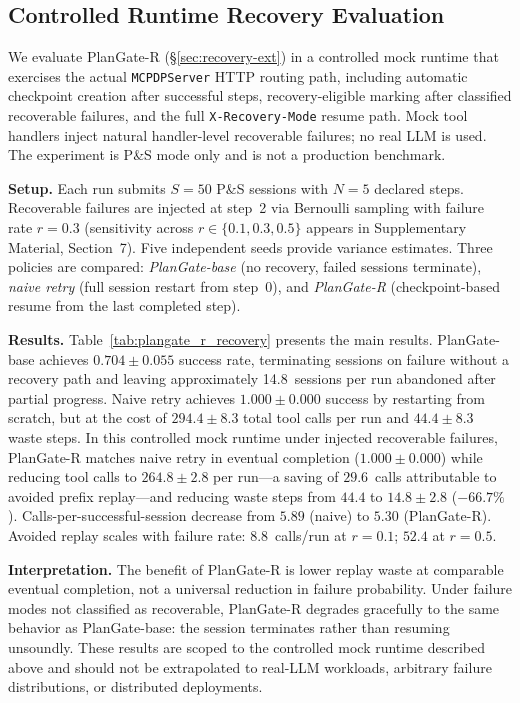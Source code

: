 \documentclass[sigconf,review,anonymous]{acmart}
\begin{document}
\subsection{Controlled Runtime Recovery Evaluation}
\label{sec:recovery-eval}

We evaluate PlanGate-R (\S\ref{sec:recovery-ext}) in a controlled mock runtime that exercises the actual \texttt{MCPDPServer} HTTP routing path, including automatic checkpoint creation after successful steps, recovery-eligible marking after classified recoverable failures, and the full \texttt{X-Recovery-Mode} resume path.
Mock tool handlers inject natural handler-level recoverable failures; no real LLM is used.
The experiment is P\&S mode only and is not a production benchmark.

\textbf{Setup.}
Each run submits $S{=}50$ P\&S sessions with $N{=}5$ declared steps.
Recoverable failures are injected at step~2 via Bernoulli sampling with failure rate $r{=}0.3$ (sensitivity across $r\in\{0.1,0.3,0.5\}$ appears in Supplementary Material, Section~7).
Five independent seeds provide variance estimates.
Three policies are compared:
\emph{PlanGate-base} (no recovery, failed sessions terminate),
\emph{naive retry} (full session restart from step~0), and
\emph{PlanGate-R} (checkpoint-based resume from the last completed step).

\textbf{Results.}
Table~\ref{tab:plangate_r_recovery} presents the main results.
PlanGate-base achieves $0.704\pm0.055$ success rate, terminating sessions on failure without a recovery path and leaving approximately 14.8~sessions per run abandoned after partial progress.
Naive retry achieves $1.000\pm0.000$ success by restarting from scratch, but at the cost of $294.4\pm8.3$ total tool calls per run and $44.4\pm8.3$ waste steps.
In this controlled mock runtime under injected recoverable failures, PlanGate-R matches naive retry in eventual completion ($1.000\pm0.000$) while reducing tool calls to $264.8\pm2.8$ per run---a saving of $29.6$~calls attributable to avoided prefix replay---and reducing waste steps from $44.4$ to $14.8\pm2.8$ ($-66.7\%$).
Calls-per-successful-session decrease from $5.89$ (naive) to $5.30$ (PlanGate-R).
Avoided replay scales with failure rate: $8.8$~calls/run at $r{=}0.1$; $52.4$ at $r{=}0.5$.

\textbf{Interpretation.}
The benefit of PlanGate-R is lower replay waste at comparable eventual completion, not a universal reduction in failure probability.
Under failure modes not classified as recoverable, PlanGate-R degrades gracefully to the same behavior as PlanGate-base: the session terminates rather than resuming unsoundly.
These results are scoped to the controlled mock runtime described above and should not be extrapolated to real-LLM workloads, arbitrary failure distributions, or distributed deployments.
\end{document}
